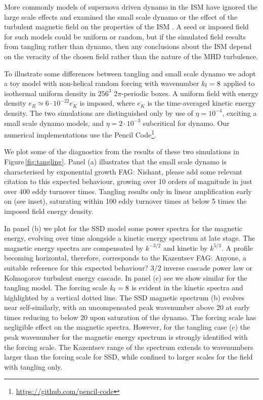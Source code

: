 \documentclass[preprint2]{aastex63}
\newcommand\kf{k_{\rm f} }
\newcommand{\fag}[1]{\textcolor{midgreen}{FAG: #1}}
\begin{document}
More commonly models of supernova driven dynamo in the ISM have ignored the 
large scale effects and examined the small scale dynamo or the effect of the
turbulent magnetic field on the properties of the ISM
\citep[e.g.,][]{BKMM04,BalKim05,MacLow:2005}.
A seed or imposed field for such models could be uniform or random, but if the
simulated field results from tangling rather than dynamo, then any conclusions
about the ISM depend on the veracity of the chosen field rather than the 
nature of the MHD turbulence.

To illustrate some differences between tangling and small scale dynamo we adopt
a toy model with non-helical random forcing with wavenumber $\kf=8$ applied to
isothermal uniform density in $256^3$ $2\pi$-periodic boxes.
A uniform field with energy density $e_B\simeq6\cdot10^{-22}\overline{e_K}$ is imposed, where $\overline{e_K}$ is the time-averaged kinetic energy density.
The two simulations are distinguished only by use of $\eta=10^{-4}$, exciting a 
small scale dynamo models, and $\eta=2\cdot10^{-3}$ subcritical for dynamo.
Our numerical implementations use the {\sc Pencil Code}\footnote{
\url{https://github.com/pencil-code}}.

We plot some of the diagnostics from the results of these two simulations in 
Figure\,\ref{fig:tangling}.
Panel (a) illustrates that the small scale dynamo 
is characterised by exponential growth \fag{Nishant, please add some relevant citation to this expected behaviour}, growing over 10 orders of magnitude in 
just over 400 eddy turnover times.
Tangling results only in linear amplification
early on (see inset), saturating within 100 eddy turnover times at below 5 times
the imposed field energy density.

In panel (b) we plot for the SSD model some power spectra for the magnetic
energy, evolving over time alongside a kinetic energy spectrum at late stage.
The magnetic energy spectra are compensated by $k^{-3/2}$ and kinetic by
$k^{5/3}$.
A profile becoming horizontal, therefore, corresponds to the Kazentsev 
\fag{Anyone, a suitable reference for this expected behaviour?} $3/2$ inverse
cascade power law or Kolmogorov turbulent energy cascade.
In panel (c) see we show similar for the tangling model.
The forcing scale $\kf=8$ is evident in the kinetic spectra and highlighted by 
a vertical dotted line.
The SSD magnetic spectrum (b) evolves near self-similarly, with an 
uncompensated peak
wavenumber above 20 at early times reducing to below 20 upon saturation of the
dynamo.
The forcing scale has negligible effect on the magnetic spectra.
However, for the tangling case (c) the peak wavenumber for the magnetic energy
spectrum is strongly identified with the forcing scale.
The Kazentsev range of the spectrum extends to wavenumbers larger than the 
forcing scale for SSD, while confined to larger scales for the field with
tangling only. 
\end{document}
